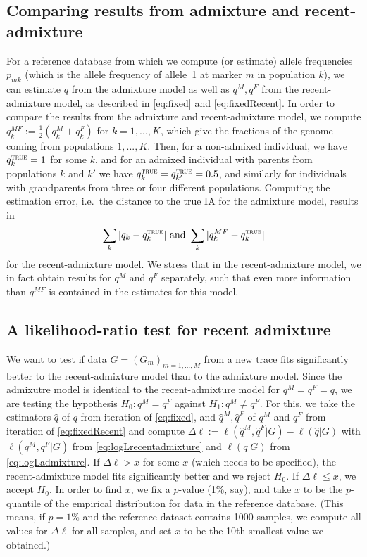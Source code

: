 \documentclass[12pt]{article}
\theoremstyle{definition}
\begin{document}
\subsection{Comparing results from admixture and recent-admixture}
For a reference database from which we compute (or estimate) allele
frequencies $p_{mk}$ (which is the allele frequency of allele~1 at
marker $m$ in population $k$), we can estimate $q$ from the admixture
model as well as $q^M,q^F$ from the recent-admixture model, as
described in \eqref{eq:fixed} and \eqref{eq:fixedRecent}. In order to
compare the results from the admixture and recent-admixture model, we
compute $q_k^{MF} := \tfrac 12 (q_k^M + q_k^F)$ for $k=1,...,K$, which
give the fractions of the genome coming from populations
$1,...,K$. Then, for a non-admixed individual, we have
$q_k^{\text{\sc true}} = 1$ for some $k$, and for an admixed
individual with parents from populations $k$ and $k'$ we have
$q_k^{\text{\sc true}} =q_{k'}^{\text{\sc true}} = 0.5$, and similarly
for individuals with grandparents from three or four different
populations. Computing the estimation error, i.e.\ the distance to the
true IA for the admixture model, results in
\begin{align}
  \label{eq:error}
  \sum_k |q_k - q_k^{\text{\sc true}}| \text{  and }\sum_k |q_k^{MF} - q_k^{\text{\sc true}}|
\end{align}
for the recent-admixture model. We stress that in the recent-admixture
model, we in fact obtain results for $q^M$ and $q^F$ separately, such
that even more information than $q^{MF}$ is contained in the estimates
for this model.

\subsection{A likelihood-ratio test for recent admixture}
We want to test if data $G = (G_m)_{m=1,...,M}$ from a new trace fits
significantly better to the recent-admixture model than to the
admixture model. Since the admixutre model is identical to the
recent-admixture model for $q^M = q^F = q$, we are testing the
hypothesis $H_0: q^M = q^F$ against $H_1: q^M\neq q^F$. For this, we
take the estimators $\hat q$ of $q$ from iteration of
\eqref{eq:fixed}, and $\hat q^M, \hat q^F$ of $q^M$ and $q^F$ from
iteration of \eqref{eq:fixedRecent} and compute
$\Delta\ell := \ell(\hat q^M, \hat q^F|G) - \ell(\hat q|G)$ with
$\ell(q^M, q^F|G)$ from \eqref{eq:logLrecentadmixture} and $\ell(q|G)$
from \eqref{eq:logLadmixture}. If $\Delta \ell >x$ for some $x$ (which
needs to be specified), the recent-admixture model fits significantly
better and we reject $H_0$. If $\Delta \ell \leq x$, we accept
$H_0$. In order to find $x$, we fix a $p$-value (1\%, say), and take
$x$ to be the $p$-quantile of the empirical distribution for data in
the reference database. (This means, if $p=1\%$ and the reference
dataset contains 1000 samples, we compute all values for $\Delta\ell$
for all samples, and set $x$ to be the 10th-smallest value we
obtained.)
\end{document}
